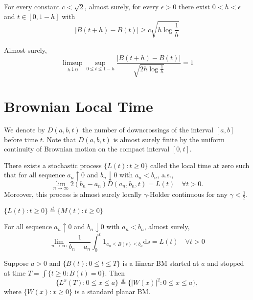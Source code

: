 \begin{lemma}
    For every constant $c<\sqrt{2}$, almost surely, for every $\epsilon>0$ there exist $0<h<\epsilon$ and $t\in [0,1-h]$ with 
    \[|B(t+h)-B(t)|\geq c\sqrt{h\log\frac{1}{h}}\]
\end{lemma}

\begin{theorem}
    Almost surely,
    \[\limsup_{h\downarrow 0}\sup_{0\leq t\leq 1-h}\frac{|B(t+h)-B(t)|}{\sqrt{2h\log\frac{1}{h}}}=1\]
\end{theorem}

\section{Brownian Local Time}
We denote by $D(a,b,t)$ the number of downcrossings of the interval $[a,b]$ before time $t$.
Note that $D(a,b,t)$ is almost surely finite by the uniform continuity of Brownian motion on the compact interval $[0,t]$.
\begin{theorem}
    There exists a stochastic process $\{L(t):t\geq 0\}$ called the local time at zero such that for all sequence $a_n\uparrow 0$ and $b_n\downarrow 0$ with 
    $a_n<b_n$, a.s.,
    \[\lim_{n\to\infty} 2(b_n-a_n)D(a_n,b_n,t)=L(t) \quad\forall t>0.\]
    Moreover, this process is almost surely locally $\gamma$-Holder continuous for any $\gamma<\frac{1}{2}$.
\end{theorem}

\begin{theorem}
    $\{L(t):t\geq 0\}\overset{d}{=}  \{M(t):t\geq 0\}$
\end{theorem}

\begin{theorem}
    For all sequence $a_n\uparrow 0$ and $b_n\downarrow 0$ with $a_n<b_n$, almost surely,
    \[\lim_{n\to\infty}\frac{1}{b_n-a_n}\int_0^t 1_{a_n\leq B(s)\leq b_n}\mathrm{d}s=L(t)\quad \forall t>0 \]
\end{theorem}


\begin{theorem}
    Suppose $a>0$ and $\{B(t):0\leq t\leq T\}$ is a liinear BM started at $a$ and stopped at time $T=\int\{t\geq 0:B(t)=0\}$.
    Then \[\{L^x(T):0\leq x\leq a\}\overset{d}{=}\{|W(x)|^2:0\leq x\leq a\},\]
    where $\{W(x):x\geq 0\}$ is a standard planar BM.
\end{theorem}

